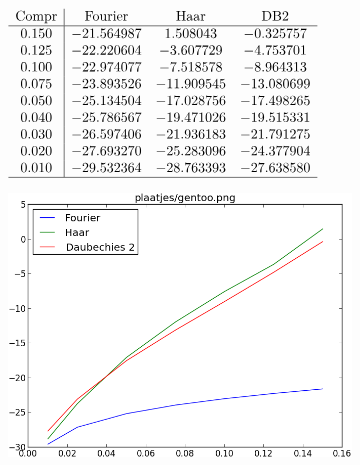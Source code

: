 \begin{figure}
  \centering
  \begin{subfigure}[t]{0.48\textwidth}
    \centering
    \vspace{10pt}
    \begingroup

    \renewcommand*{\arraystretch}{1.5}
    $\begin{array}{c | c c c c}
      \text{Compr} & \text{Fourier} & \text{Haar} & \text{DB2} \\ \hline
      0.150 & -21.564987 & 1.508043 & -0.325757 \\
      0.125 & -22.220604 & -3.607729 & -4.753701 \\
      0.100 & -22.974077 & -7.518578 & -8.964313 \\
      0.075 & -23.893526 & -11.909545 & -13.080699 \\
      0.050 & -25.134504 & -17.028756 & -17.498265 \\
      0.040 & -25.786567 & -19.471026 & -19.515331 \\
      0.030 & -26.597406 & -21.936183 & -21.791275 \\
      0.020 & -27.693270 & -25.283096 & -24.377904 \\
      0.010 & -29.532364 & -28.763393 & -27.638580 \\ \hline
    \end{array}$
    \endgroup
  \end{subfigure}
  \begin{subfigure}[t]{0.48\textwidth}
    \centering
    \vspace{0pt}
    \includegraphics[height=\textwidth]{plaatjes/grafiek_gentoo_0_15-0_01.png}
  \end{subfigure}
\end{figure}
\restoregeometry
\pagebreak


